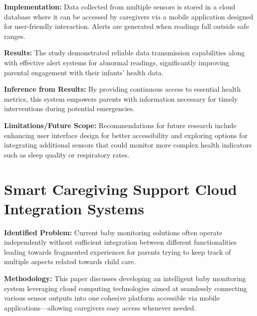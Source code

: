 \documentclass[12pt,a4paper]{report}
\begin{document}
\noindent\textbf{Implementation:} Data collected from multiple sensors is stored in a cloud database where it can be accessed by caregivers via a mobile application designed for user-friendly interaction. Alerts are generated when readings fall outside safe ranges.
\setlength{\parskip}{1em}  %

\noindent\textbf{Results:} The study demonstrated reliable data transmission capabilities along with effective alert systems for abnormal readings, significantly improving parental engagement with their infants' health data.

\setlength{\parskip}{1em}  %


\noindent\textbf{Inference from Results:} By providing continuous access to essential health metrics, this system empowers parents with information necessary for timely interventions during potential emergencies.


\setlength{\parskip}{1em}  %

\noindent\textbf{Limitations/Future Scope:} Recommendations for future research include enhancing user interface design for better accessibility and exploring options for integrating additional sensors that could monitor more complex health indicators such as sleep quality or respiratory rates.
\setlength{\parskip}{1em}  %


\section{Smart Caregiving Support Cloud Integration Systems}
\textbf{Identified Problem:} Current baby monitoring solutions often operate independently without sufficient integration between different functionalities leading towards fragmented experiences for parents trying to keep track of multiple aspects related towards child care\cite{10578217}.

\setlength{\parskip}{1em}  %


\noindent\textbf{Methodology:} This paper discusses developing an intelligent baby monitoring system leveraging cloud computing technologies aimed at seamlessly connecting various sensor outputs into one cohesive platform accessible via mobile applications—allowing caregivers easy access whenever needed.

\setlength{\parskip}{1em}  %
\end{document}
